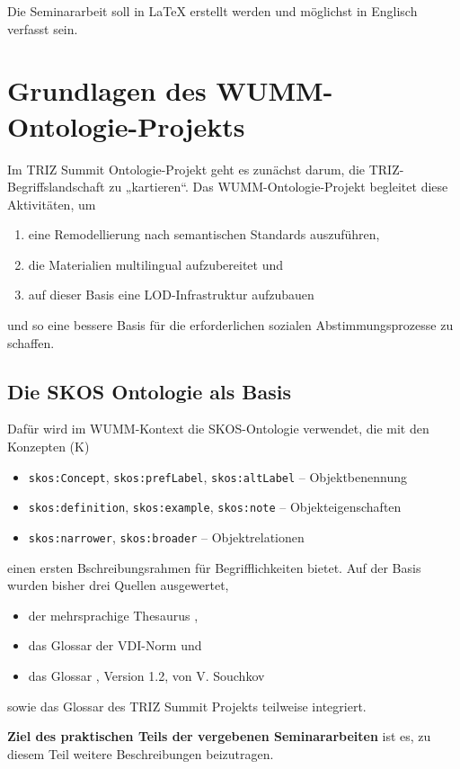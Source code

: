 \documentclass[11pt,a4paper]{article}
\begin{document}
Die Seminararbeit soll in {\LaTeX} erstellt werden und möglichst in Englisch
verfasst sein.

\section{Grundlagen des WUMM-Ontologie-Projekts}

Im TRIZ Summit Ontologie-Projekt geht es zunächst darum, die
TRIZ-Begriffslandschaft zu „kartieren“.  Das WUMM-Ontologie-Projekt begleitet
diese Aktivitäten, um
\begin{enumerate}[noitemsep]
\item eine Remodellierung nach semantischen Standards auszuführen,
\item die Materialien multilingual aufzubereitet und
\item auf dieser Basis eine LOD-Infrastruktur aufzubauen
\end{enumerate}
und so eine bessere Basis für die erforderlichen sozialen Abstimmungsprozesse
zu schaffen.

\subsection{Die SKOS Ontologie als Basis}

Dafür wird im WUMM-Kontext die SKOS-Ontologie \cite{SKOS} verwendet, die mit
den Konzepten (K)
\begin{itemize}[noitemsep]
\item \texttt{skos:Concept}, \texttt{skos:prefLabel}, \texttt{skos:altLabel}
  -- Objektbenennung
\item \texttt{skos:definition}, \texttt{skos:example}, \texttt{skos:note} --
  Objekteigenschaften
\item \texttt{skos:narrower}, \texttt{skos:broader} -- Objektrelationen
\end{itemize}
einen ersten Bschreibungsrahmen für Begrifflichkeiten bietet.  Auf der Basis
wurden bisher drei Quellen ausgewertet,  
\begin{itemize}[noitemsep]
\item der mehrsprachige Thesaurus \cite{GSA},
\item das Glossar der VDI-Norm \cite{VDI} und
\item das Glossar \cite{SG}, Version 1.2, von V. Souchkov
\end{itemize}
sowie das Glossar des TRIZ Summit Projekts teilweise integriert.

\textbf{Ziel des praktischen Teils der vergebenen Seminararbeiten} ist es, zu
diesem Teil weitere Beschreibungen beizutragen.
\end{document}
